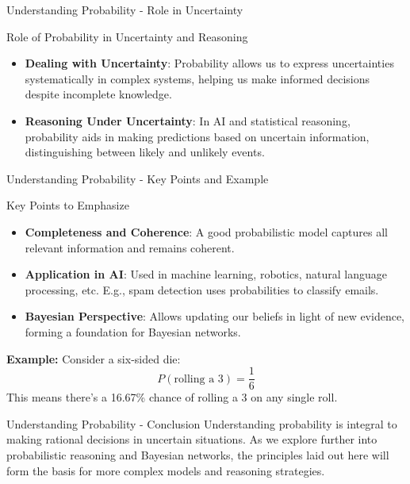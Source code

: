 \documentclass[aspectratio=169]{beamer}
\begin{document}
\begin{frame}[fragile]{Understanding Probability - Role in Uncertainty}
    \begin{block}{Role of Probability in Uncertainty and Reasoning}
        \begin{itemize}
            \item \textbf{Dealing with Uncertainty}: Probability allows us to express uncertainties systematically in complex systems, helping us make informed decisions despite incomplete knowledge.
            
            \item \textbf{Reasoning Under Uncertainty}: In AI and statistical reasoning, probability aids in making predictions based on uncertain information, distinguishing between likely and unlikely events.
        \end{itemize}
    \end{block}
\end{frame}

\begin{frame}[fragile]{Understanding Probability - Key Points and Example}
    \begin{block}{Key Points to Emphasize}
        \begin{itemize}
            \item \textbf{Completeness and Coherence}: A good probabilistic model captures all relevant information and remains coherent.
            \item \textbf{Application in AI}: Used in machine learning, robotics, natural language processing, etc. E.g., spam detection uses probabilities to classify emails.
            \item \textbf{Bayesian Perspective}: Allows updating our beliefs in light of new evidence, forming a foundation for Bayesian networks.
        \end{itemize}
    \end{block}
  
    \textbf{Example:} Consider a six-sided die:
    \begin{equation}
        P(\text{rolling a 3}) = \frac{1}{6}
    \end{equation}
    This means there’s a 16.67\% chance of rolling a 3 on any single roll.
\end{frame}

\begin{frame}[fragile]{Understanding Probability - Conclusion}
    Understanding probability is integral to making rational decisions in uncertain situations. As we explore further into probabilistic reasoning and Bayesian networks, the principles laid out here will form the basis for more complex models and reasoning strategies.
\end{frame}
\end{document}
